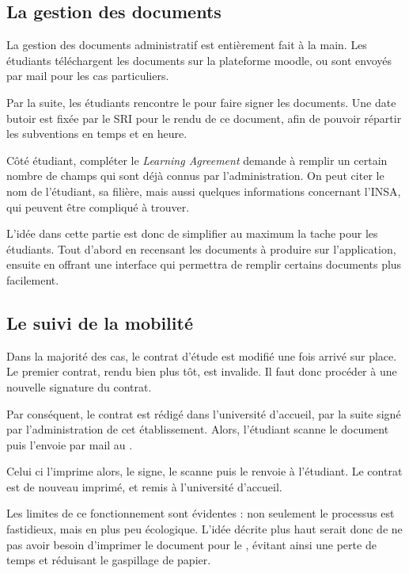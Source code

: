 		\subsection{La gestion  des documents}
		La gestion des documents administratif est entièrement fait à la main. Les étudiants téléchargent les documents sur la plateforme moodle, ou sont envoyés par mail pour les cas particuliers. 
                
                Par la suite, les étudiants rencontre le \ri pour faire signer les documents. Une date butoir est fixée par le SRI pour le rendu de ce document, afin de pouvoir répartir les subventions en temps et en heure. 

\medbreak

Côté étudiant, compléter le \textit{Learning Agreement} demande à remplir un certain nombre de champs qui sont déjà connus par l'administration. On peut citer le nom de l'étudiant, sa filière, mais aussi quelques informations concernant l'INSA, qui peuvent être compliqué à trouver. 

\medbreak

L'idée dans cette partie est donc de simplifier au maximum la tache pour les étudiants. Tout d'abord en recensant les documents à produire sur l'application, ensuite en offrant une interface qui permettra de remplir certains documents plus facilement. 

\subsection{Le suivi de la mobilité}

Dans la majorité des cas, le contrat d'étude est modifié une fois arrivé sur place. Le premier contrat, rendu bien plus tôt, est invalide. Il faut donc procéder à une nouvelle signature du contrat. 

Par conséquent, le contrat est rédigé dans l'université d'accueil, par la suite  signé par l'administration de cet établissement. Alors, l'étudiant scanne  le document puis l'envoie par mail au \ri. 

Celui ci l'imprime alors, le signe, le scanne puis le renvoie à l'étudiant. Le contrat est  de nouveau imprimé, et remis à l'université d'accueil. 

\medbreak

Les limites de ce fonctionnement sont évidentes : non seulement le processus est fastidieux, mais en plus peu écologique. L'idée décrite plus haut serait donc de ne pas avoir besoin d'imprimer le document pour le \ri, évitant ainsi une perte de temps et réduisant le gaspillage de papier. 

